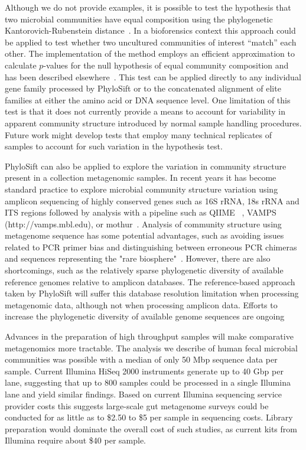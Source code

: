 \documentclass[10pt]{article}
\begin{document}
Although we do not provide examples, it is possible to test the hypothesis that two microbial communities have equal composition using the phylogenetic Kantorovich-Rubenstein distance~\cite{Evans2010}.
In a bioforensics context this approach could be applied to test whether two uncultured communities of interest ``match'' each other.
The implementation of the method employs an efficient approximation to calculate $p$-values for the null hypothesis of equal community composition and has been described elsewhere~\cite{Evans2010}.
This test can be applied directly to any individual gene family processed by PhyloSift or to the concatenated alignment of elite families at either the amino acid or DNA sequence level.
One limitation of this test is that it does not currently provide a means to account for variability in apparent community structure introduced by normal sample handling procedures.
Future work might develop tests that employ many technical replicates of samples to account for such variation in the hypothesis test.

PhyloSift can also be applied to explore the variation in community structure present in a collection metagenomic samples.
In recent years it has become standard practice to explore microbial community structure variation using amplicon sequencing of highly conserved genes such as 16S rRNA, 18s rRNA and ITS regions followed by analysis with a pipeline such as QIIME ~\cite{Caporaso2010}, VAMPS (http://vamps.mbl.edu), or mothur~\cite{schloss2009}.
Analysis of community structure using metagenome sequence has some potential advantages, such as avoiding issues related to PCR primer bias and distinguishing between erroneous PCR chimeras and sequences representing the "rare biosphere"~\cite{Bik2012}.
However, there are also shortcomings, such as the relatively sparse phylogenetic diversity of available reference genomes relative to amplicon databases.
The reference-based approach taken by PhyloSift will suffer this database resolution limitation when processing metagenomic data, although not when processing amplicon data.
Efforts to increase the phylogenetic diversity of available genome sequences are ongoing~\cite{Wu2009,rinke2013insights,shih2013improving}

Advances in the preparation of high throughput samples will make comparative metagenomics more tractable.
The analysis we describe of human fecal microbial communities was possible with a median of only 50 Mbp sequence data per sample.
Current Illumina HiSeq 2000 instruments generate up to 40 Gbp per lane, suggesting that up to 800 samples could be processed in a single Illumina lane and yield similar findings.
Based on current Illumina sequencing service provider costs this suggests large-scale gut metagenome surveys could be conducted for as little as to \$2.50 to \$5 per sample in sequencing costs.
Library preparation would dominate the overall cost of such studies, as current kits from Illumina require about \$40 per sample.
\end{document}
